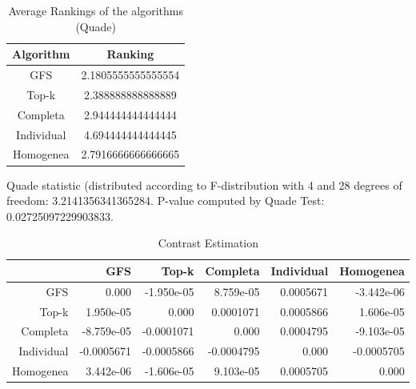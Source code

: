 \documentclass[a4paper,10pt]{article}
\begin{document}
\begin{landscape}
\newpage

\begin{table}[!htp]
\centering
\caption{Average Rankings of the algorithms (Quade)
}\begin{tabular}{c|c}
Algorithm&Ranking\\
\hline
GFS&2.1805555555555554\\
Top-k&2.388888888888889\\
Completa&2.944444444444444\\
Individual&4.694444444444445\\
Homogenea&2.7916666666666665\\
\end{tabular}
\end{table}
Quade statistic (distributed according to F-distribution with 4 and 28 degrees of freedom: 3.2141356341365284. 
P-value computed by Quade Test: 0.02725097229903833.\newline


\newpage

\begin{table}[!htp]
\centering\tiny
\caption{Contrast Estimation}
\begin{tabular}{
|r|r|r|r|r|r|}
\hline
 &GFS&Top-k&Completa&Individual&Homogenea\\
\hline
GFS&0.000&-1.950e-05&8.759e-05&0.0005671&-3.442e-06\\
\hline
Top-k&1.950e-05&0.000&0.0001071&0.0005866&1.606e-05\\
\hline
Completa&-8.759e-05&-0.0001071&0.000&0.0004795&-9.103e-05\\
\hline
Individual&-0.0005671&-0.0005866&-0.0004795&0.000&-0.0005705\\
\hline
Homogenea&3.442e-06&-1.606e-05&9.103e-05&0.0005705&0.000\\
\hline

\end{tabular}
\end{table}

\newpage


\end{landscape}
\end{document}
